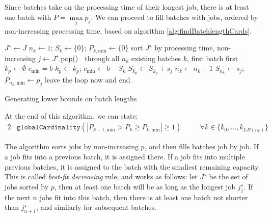 Since  batches take on the processing time of their longest job, there is at
least one batch with $P = \underset{j}{\max} p_j $. We can proceed to fill batches with jobs, ordered by non-increasing processing
time, based on algorithm \ref{alg:findBatchlengthCards}. 

\begin{algorithm}[h!]
\fontsize{9pt}{11.5pt}\selectfont \begin{algorithmic} \State $J^{\star} \gets J$
 \State $n_k \gets 1$; $S_k
\gets \{0\}$; $P_{k,\text{min}} \gets \{0\}$  \State sort $J^{\star}$ by processing time, non-increasing
\Repeat \State $j \gets J^{\star}$.pop()  \Loop $\;$ through all $n_k$ existing batches $k$, first
batch first \State $k_p \gets \emptyset$  \State
$c_\text{min} = b$   \State $k_p \gets k_p$; $c_\text{min} \gets
b-S_k$ \EndIf \EndLoop {} \State $S_{k_p} \gets S_{k_p} + s_j$
 \Else {} \State $n_k
\gets n_k + 1$ \State $S_{n_k} \gets s_j$;
$P_{n_k,\text{min}} \gets p_j$ 
\Else \State leave the loop now and end.  \EndIf \EndIf {} \end{algorithmic} \caption{Generating lower bounds on batch lengths}
\label{alg:findBatchlengthCards} \end{algorithm}
At the end of this algorithm, we can state: \begin{alignat}{2} &
\mathtt{globalCardinality}( |P_{k-1,\text{min}} > P_k \geq P_{k,\text{min}} |
\geq 1) \quad && \forall k \in \{k_0,\dots,k_{LB(n_k)}\} \end{alignat}

The algorithm sorts jobs by non-increasing $p$, and then fills batches job by
job. If a job fits into a previous batch, it is assigned there. If a job fits
into multiple previous batches, it is assigned to the batch with the smallest
remaining capacity. This is called \textit{best-fit decreasing} rule,
and works as follows: let $J^\star$ be the set of jobs sorted by $p$, then at
least one batch will be as long as the longest job $j^\star_1$. If the next $n$
jobs fit into this batch, then there is at least one batch not shorter than
$j^\star_{n+1}$, and similarly for subsequent batches. 

